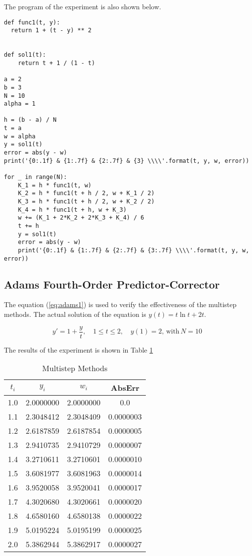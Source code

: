 \documentclass[preprint,12pt]{elsarticle}
\begin{document}
The program of the experiment is also shown below.
\begin{lstlisting}
def func1(t, y):
  return 1 + (t - y) ** 2


def sol1(t):
    return t + 1 / (1 - t)

a = 2
b = 3
N = 10
alpha = 1

h = (b - a) / N
t = a
w = alpha
y = sol1(t)
error = abs(y - w)
print('{0:.1f} & {1:.7f} & {2:.7f} & {3} \\\\'.format(t, y, w, error))

for _ in range(N):
    K_1 = h * func1(t, w)
    K_2 = h * func1(t + h / 2, w + K_1 / 2)
    K_3 = h * func1(t + h / 2, w + K_2 / 2)
    K_4 = h * func1(t + h, w + K_3)
    w += (K_1 + 2*K_2 + 2*K_3 + K_4) / 6
    t += h
    y = sol1(t)
    error = abs(y - w)
    print('{0:.1f} & {1:.7f} & {2:.7f} & {3:.7f} \\\\'.format(t, y, w, error))

\end{lstlisting}

\subsection{Adams Fourth-Order Predictor-Corrector}
\label{SS:3.2}

The equation (\ref{eq:adams1}) is used to verify the effectiveness of the multistep methods. The actual solution of the equation is $y(t)=t\ln{t} + 2t$.

\begin{equation}
\label{eq:adams1}
  y' = 1 + \frac{y}{t},\quad 1\leq t\leq 2,\quad y(1)=2,\, \mathrm{with}\,N=10
\end{equation}

The results of the experiment is shown in Table \ref{tab:adams}

\begin{table}[h]
  \centering
  \begin{tabular}{cccc}
    \hline
    $t_i$ & $y_i$ & $w_i$ & AbsErr \\
    \hline
    1.0 & 2.0000000 & 2.0000000 & 0.0 \\
    1.1 & 2.3048412 & 2.3048409 & 0.0000003 \\
    1.2 & 2.6187859 & 2.6187854 & 0.0000005 \\
    1.3 & 2.9410735 & 2.9410729 & 0.0000007 \\
    1.4 & 3.2710611 & 3.2710601 & 0.0000010 \\
    1.5 & 3.6081977 & 3.6081963 & 0.0000014 \\
    1.6 & 3.9520058 & 3.9520041 & 0.0000017 \\
    1.7 & 4.3020680 & 4.3020661 & 0.0000020 \\
    1.8 & 4.6580160 & 4.6580138 & 0.0000022 \\
    1.9 & 5.0195224 & 5.0195199 & 0.0000025 \\
    2.0 & 5.3862944 & 5.3862917 & 0.0000027
  \end{tabular}
  \caption{Multistep Methods}
  \label{tab:adams}
\end{table}
\end{document}
